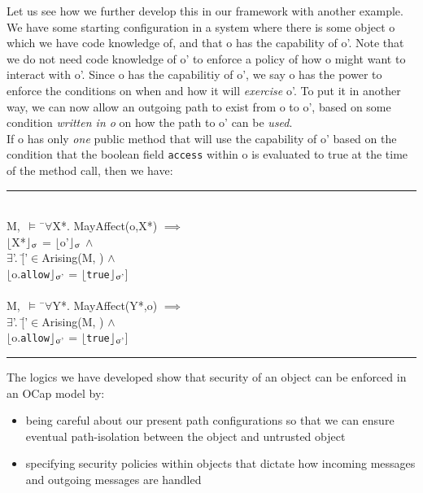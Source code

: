 \documentclass[a4paper,11pt, twoside,twocolumn]{article}
\newenvironment{logic}
{\begin{minipage}[c]{\linewidth}  \small \vspace{0.5em}\begin{tabbing}}
{\end{tabbing}\end{minipage}\vspace{0.5em}}
\newcommand{\loin}{$\in$}
\newcommand{\loforall}{$\forall$}
\newcommand{\loexists}{$\exists$}
\newcommand{\loand}{$\land$}
\newcommand{\loimplies}{$\implies$}
\newcommand{\losigma}{\text{$\upsigma$}}
\newcommand{\loturns} {$\vDash$}
\newcommand{\loexec}[2] {$\lfloor$#1$\rfloor _{\text{#2}}$}
\newcommand{\hr}{\rule{\linewidth}{0.4pt}}
\begin{document}
Let us see how we further develop this in our framework with another example.\\

We have some starting configuration in a system where there is some object o which we have code knowledge of, and that o has the capability of o'. Note that we do not need code knowledge of o' to enforce a policy of how o might want to interact with o'. Since o has the capabilitiy of o', we say o has the power to enforce the conditions on when and how it will \textit{exercise} o'. To put it in another way, we can now allow an outgoing path to exist from o to o', based on some condition \textit{written in o} on how the path to o' can be \textit{used}.\\

If o has only \textit{one} public method that will use the capability of o' based on the condition that the boolean field \texttt{access} within o is evaluated to true at the time of the method call, then we have:

\begin{logic}
\hr\\
M,\losigma\ \loturns\ \=\loforall X*. MayAffect(o,X*) \loimplies \\
\> \loexec{X*}{\losigma} = \loexec{o'}{\losigma} \loand\\
\> \loexists \losigma'. $[$\=\losigma'\loin Arising(M, \losigma) \loand\\
\> \>\loexec{o.\texttt{allow}}{\losigma'} = \loexec{\texttt{true}}{\losigma'}$]$\\
\\
M,\losigma\ \loturns\ \=\loforall Y*. MayAffect(Y*,o) \loimplies \\
\> \loexists \losigma'. $[$\=\losigma'\loin Arising(M, \losigma) \loand\\
\> \>\loexec{o.\texttt{allow}}{\losigma'} = \loexec{\texttt{true}}{\losigma'}$]$\\

\hr
\end{logic}
The logics we have developed show that security of an object can be enforced in an OCap model by:

\begin{itemize}
\item being careful about our present path configurations so that we can ensure eventual path-isolation between the object and untrusted object
\item specifying security policies {within} objects that dictate how incoming messages and outgoing messages are handled
\end{itemize}
\end{document}
